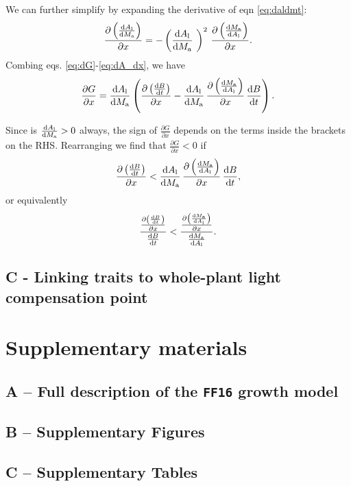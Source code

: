 \documentclass[a4paper,11pt]{article}
\begin{document}
We can further simplify by expanding the derivative of eqn \ref{eq:daldmt}:
\begin{equation} \label{eq:dA_dx}
\frac{\partial \left(\frac{{\rm d}A_{\rm l}} {{\rm d}M_{\rm a}}\right)}
{\partial x} = -\left(\frac{{\rm d}A_{\rm l}} {{\rm d}M_{\rm a}}\ \right)^2
\, \frac{\partial \left(\frac{{\rm d}M_{\rm a}} {{\rm d}A_{\rm l}}\right)
}{\partial x}.
\end{equation}
Combing eqs. \ref{eq:dG}-\ref{eq:dA_dx}, we have
\begin{equation} \label{eq:dG2}
\frac{\partial G} {\partial x} =
\frac{{\rm d}A_{\rm l}} {{\rm d}M_{\rm a}}
\left(
\frac{\partial \left( \frac{ {\rm d}B} {{\rm d}t}\right)}{\partial x}
- \frac{{\rm d}A_{\rm l}} {{\rm d}M_{\rm a}}
\,  \frac{\partial \left(\frac{{\rm d}M_{\rm a}} {{\rm d}A_{\rm l}}\right)
}{\partial x}
 \, \frac{ {\rm d}B} {{\rm d}t}
\right).
\end{equation}

Since is $\frac{{\rm d}A_{\rm l}} {{\rm d}M_{\rm a}}>0$ always, the sign
of $\frac{\partial G} {\partial x}$ depends on the terms inside the brackets on the
RHS. Rearranging we find that $\frac
{\partial G} {\partial x} < 0$ if
\begin{equation}\label{eq:dg3}
\frac{\partial \left( \frac{ {\rm d}B} {{\rm d}t}\right)}{\partial x}
< \frac{{\rm d}A_{\rm l}} {{\rm d}M_{\rm a}}
\,  \frac{\partial \left(\frac{{\rm d}M_{\rm a}} {{\rm d}A_{\rm l}}\right)
}{\partial x} \, \frac{ {\rm d}B} {{\rm d}t},
\end{equation}
or equivalently
\begin{equation}\label{eq:dg4_orig}
\frac{
\frac{\partial \left( \frac{ {\rm d}B} {{\rm d}t}\right)}{\partial x} }
{\frac{ {\rm d}B} {{\rm d}t}}
<
\frac{ \frac{\partial \left(\frac{{\rm d}M_{\rm a}} {{\rm d}A_{\rm l}}\right)
}{\partial x}}{\frac{{\rm d}M_{\rm a}} {{\rm d}A_{\rm l}}}.
\end{equation}

\subsection{C - Linking traits to whole-plant light compensation point} \label{app:traits-RGR}

\section{Supplementary materials}

\subsection{A -- Full description of the \texttt{FF16} growth model}\label{sec:ff16}

\subsection{B -- Supplementary Figures}\label{sec:SM_figs}

\subsection{C -- Supplementary Tables}\label{sec:SM_tabs}

\footnotesize


\end{document}
